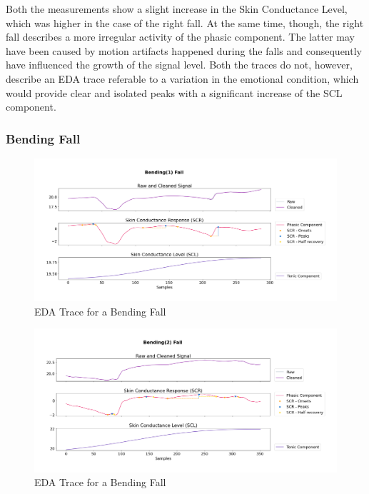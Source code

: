 Both the measurements show a slight increase in the Skin Conductance Level, which was higher in the case of the right fall. At the same time, though, the right fall describes a more irregular activity of the phasic component. The latter may have been caused by motion artifacts happened during the falls and consequently have influenced the growth of the signal level. Both the traces do not, however, describe an EDA trace referable to a variation in the emotional condition, which would provide clear and isolated peaks with a significant increase of the SCL component.

\subsubsection{Bending Fall}\label{subsubsec:bending-fall}

\begin{figure}[H]
    \centering
    \includegraphics[width=\textwidth]{./images/movisens/Bending1.png}
    \caption{EDA Trace for a Bending Fall}
    \label{fig:movisens-bending1}
\end{figure}

\begin{figure}[H]
    \centering
    \includegraphics[width=\textwidth]{./images/movisens/Bending2.png}
    \caption{EDA Trace for a Bending Fall}
    \label{fig:movisens-bending2}
\end{figure}

